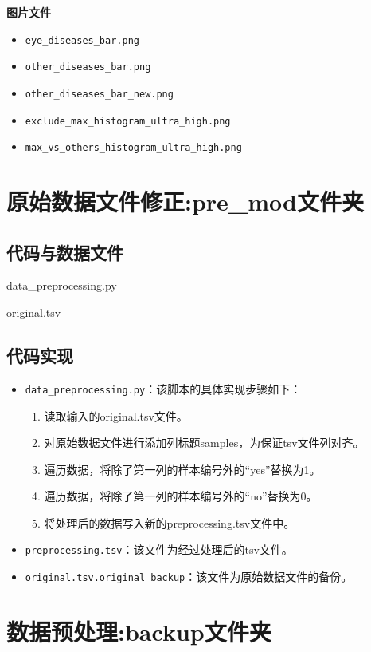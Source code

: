 \documentclass[UTF8]{report}
\theoremstyle{MyLineTheoremStyle} %
\theoremstyle{MyBlockTheoremStyle} %
\theoremstyle{MySubsubsectionStyle} %
\begin{document}
\textbf{图片文件}
\begin{itemize}
    \item \texttt{eye\_diseases\_bar.png}
    \item \texttt{other\_diseases\_bar.png}
    \item \texttt{other\_diseases\_bar\_new.png}
    \item \texttt{exclude\_max\_histogram\_ultra\_high.png}
    \item \texttt{max\_vs\_others\_histogram\_ultra\_high.png}
\end{itemize}



\section{原始数据文件修正:pre\_mod文件夹}

\subsection{代码与数据文件}
data\_preprocessing.py

original.tsv

\subsection{代码实现}

\begin{itemize}
    \item \texttt{data\_preprocessing.py}：该脚本的具体实现步骤如下：
    \begin{enumerate}
        \item 读取输入的original.tsv文件。
        \item 对原始数据文件进行添加列标题samples，为保证tsv文件列对齐。
        \item 遍历数据，将除了第一列的样本编号外的“yes”替换为1。
        \item 遍历数据，将除了第一列的样本编号外的“no”替换为0。
        \item 将处理后的数据写入新的preprocessing.tsv文件中。
    \end{enumerate}
    \item \texttt{preprocessing.tsv}：该文件为经过处理后的tsv文件。
    \item \texttt{original.tsv.original\_backup}：该文件为原始数据文件的备份。
\end{itemize}


\section{数据预处理:backup文件夹}
\end{document}
